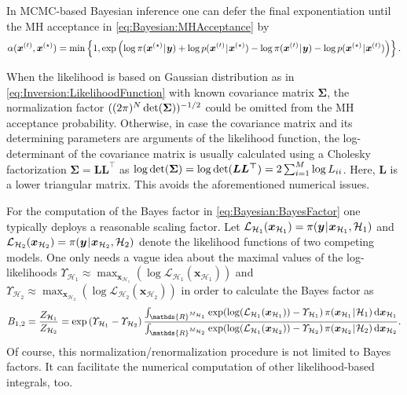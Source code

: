 In MCMC-based Bayesian inference one can defer the final exponentiation until the MH acceptance in \cref{eq:Bayesian:MHAcceptance} by
\begin{equation}
  \alpha(\bm{x}^{(t)}, \bm{x}^{(\star)}) = \operatorname{min} \left\{ 1, \exp \left( \log \pi(\bm{x}^{(\star)} \cond \bm{y}) + \log p(\bm{x}^{(t)} \cond \bm{x}^{(\star)})
  - \log \pi(\bm{x}^{(t)} \cond \bm{y}) - \log p(\bm{x}^{(\star)} \cond \bm{x}^{(t)}) \right) \right\}.
\end{equation}
\par %
When the likelihood is based on Gaussian distribution as in \cref{eq:Inversion:LikelihoodFunction} with known covariance matrix \(\bm{\Sigma}\),
the normalization factor \(((2\pi)^{N} \det(\bm{\Sigma}))^{-1/2}\) could be omitted from the MH acceptance probability.
Otherwise, in case the covariance matrix and its determining parameters are arguments of the likelihood function,
the log-determinant of the covariance matrix is usually calculated using a Cholesky factorization \(\bm{\Sigma} = \bm{\bm{L} \bm{L}^\top}\)
as \(\log \det (\bm{\Sigma}) = \log \det (\bm{\bm{L} \bm{L}^\top}) = 2 \sum_{i=1}^{M} \log L_{ii}\).
Here, \(\bm{L}\) is a lower triangular matrix.
This avoids the aforementioned numerical issues.
\par %
For the computation of the Bayes factor in \cref{eq:Bayesian:BayesFactor} one typically deploys a reasonable scaling factor.
Let \(\mathcal{L}_{\mathcal{H}_1}(\bm{x}_{\mathcal{H}_1}) = \pi(\bm{y} {\:\!}|{\:\!} \bm{x}_{\mathcal{H}_1},\mathcal{H}_1)\)
and \(\mathcal{L}_{\mathcal{H}_2}(\bm{x}_{\mathcal{H}_2}) = \pi(\bm{y} {\:\!}|{\:\!} \bm{x}_{\mathcal{H}_2},\mathcal{H}_2)\)
denote the likelihood functions of two competing models.
One only needs a vague idea about the maximal values of the log-likelihoods
\(\varUpsilon_{\mathcal{H}_1} \approx \operatorname{max}_{\bm{x}_{\mathcal{H}_1}}(\log \mathcal{L}_{\mathcal{H}_1}(\bm{x}_{\mathcal{H}_1}))\)
and \(\varUpsilon_{\mathcal{H}_2} \approx \operatorname{max}_{\bm{x}_{\mathcal{H}_2}}(\log \mathcal{L}_{\mathcal{H}_2}(\bm{x}_{\mathcal{H}_2}))\)
in order to calculate the Bayes factor as
\begin{equation}
  B_{1,2} = \frac{\scale_{\mathcal{H}_1}}{\scale_{\mathcal{H}_2}}
  = \exp \left( \varUpsilon_{\mathcal{H}_1} - \varUpsilon_{\mathcal{H}_2} \right)
  \frac{\int_{\mathds{R}^{\dimParam_{\mathcal{H}_1}}} \exp(\log(\mathcal{L}_{\mathcal{H}_1}(\bm{x}_{\mathcal{H}_1})) - \varUpsilon_{\mathcal{H}_1})
  \, \pi(\bm{x}_{\mathcal{H}_1} \cond \mathcal{H}_1) \, \mathrm{d} \bm{x}_{\mathcal{H}_1}}
  {\int_{\mathds{R}^{\dimParam_{\mathcal{H}_2}}} \exp(\log( \mathcal{L}_{\mathcal{H}_1}(\bm{x}_{\mathcal{H}_2})) - \varUpsilon_{\mathcal{H}_2})
  \, \pi(\bm{x}_{\mathcal{H}_2} \cond \mathcal{H}_2) \, \mathrm{d} \bm{x}_{\mathcal{H}_2}}.
\end{equation}
Of course, this normalization/renormalization procedure is not limited to Bayes factors.
It can facilitate the numerical computation of other likelihood-based integrals, too.